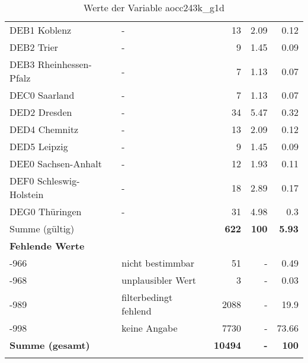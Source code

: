 \begin{longtable}{Xlrrr}
        \multicolumn{1}{X}{DEB1 Koblenz} & - & \num{13} & \num[round-mode=places,round-precision=2]{2.09} & \num[round-mode=places,round-precision=2]{0.12} \\
        \multicolumn{1}{X}{DEB2 Trier} & - & \num{9} & \num[round-mode=places,round-precision=2]{1.45} & \num[round-mode=places,round-precision=2]{0.09} \\
        \multicolumn{1}{X}{DEB3 Rheinhessen-Pfalz} & - & \num{7} & \num[round-mode=places,round-precision=2]{1.13} & \num[round-mode=places,round-precision=2]{0.07} \\
        \multicolumn{1}{X}{DEC0 Saarland} & - & \num{7} & \num[round-mode=places,round-precision=2]{1.13} & \num[round-mode=places,round-precision=2]{0.07} \\
        \multicolumn{1}{X}{DED2 Dresden} & - & \num{34} & \num[round-mode=places,round-precision=2]{5.47} & \num[round-mode=places,round-precision=2]{0.32} \\
        \multicolumn{1}{X}{DED4 Chemnitz} & - & \num{13} & \num[round-mode=places,round-precision=2]{2.09} & \num[round-mode=places,round-precision=2]{0.12} \\
        \multicolumn{1}{X}{DED5 Leipzig} & - & \num{9} & \num[round-mode=places,round-precision=2]{1.45} & \num[round-mode=places,round-precision=2]{0.09} \\
        \multicolumn{1}{X}{DEE0 Sachsen-Anhalt} & - & \num{12} & \num[round-mode=places,round-precision=2]{1.93} & \num[round-mode=places,round-precision=2]{0.11} \\
        \multicolumn{1}{X}{DEF0 Schleswig-Holstein} & - & \num{18} & \num[round-mode=places,round-precision=2]{2.89} & \num[round-mode=places,round-precision=2]{0.17} \\
        \multicolumn{1}{X}{DEG0 Thüringen} & - & \num{31} & \num[round-mode=places,round-precision=2]{4.98} & \num[round-mode=places,round-precision=2]{0.3} \\
     \midrule
      \multicolumn{2}{l}{Summe (gültig)} & \textbf{\num{622}} &
      \textbf{\num{100}} &
         \textbf{\num[round-mode=places,round-precision=2]{5.93}} \\
     \multicolumn{5}{l}{\textbf{Fehlende Werte}}\\
       -966 & nicht bestimmbar & \num{51} & - & \num[round-mode=places,round-precision=2]{0.49} \\

       -968 & unplausibler Wert & \num{3} & - & \num[round-mode=places,round-precision=2]{0.03} \\

       -989 & filterbedingt fehlend & \num{2088} & - & \num[round-mode=places,round-precision=2]{19.9} \\

       -998 & keine Angabe & \num{7730} & - & \num[round-mode=places,round-precision=2]{73.66} \\

     \midrule
     \multicolumn{2}{l}{\textbf{Summe (gesamt)}} & \textbf{\num{10494}} & \textbf{-} & \textbf{\num{100}} \\
     \bottomrule
     \caption{Werte der Variable aocc243k\_g1d}
     \end{longtable}
     
